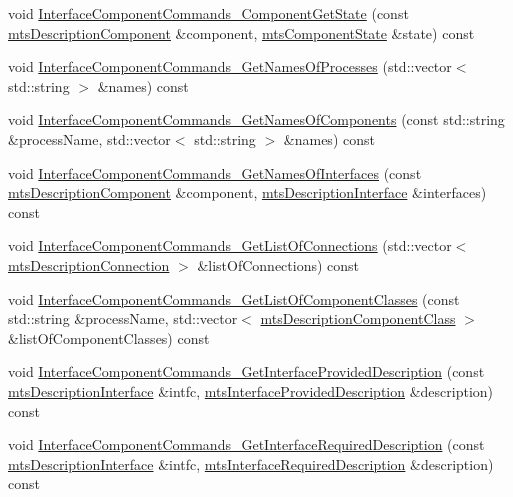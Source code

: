 \begin{DoxyCompactItemize}
\item 
void \hyperlink{classmts_manager_component_client_a71563477c115e8e5e09fd70e989a60db}{Interface\-Component\-Commands\-\_\-\-Component\-Get\-State} (const \hyperlink{classmts_description_component}{mts\-Description\-Component} \&component, \hyperlink{classmts_component_state}{mts\-Component\-State} \&state) const 
\item 
void \hyperlink{classmts_manager_component_client_a9f58399384c52a9fa6c05a3533467a4c}{Interface\-Component\-Commands\-\_\-\-Get\-Names\-Of\-Processes} (std\-::vector$<$ std\-::string $>$ \&names) const 
\item 
void \hyperlink{classmts_manager_component_client_adb5405af61fdc8d9689cf63bb6090a34}{Interface\-Component\-Commands\-\_\-\-Get\-Names\-Of\-Components} (const std\-::string \&process\-Name, std\-::vector$<$ std\-::string $>$ \&names) const 
\item 
void \hyperlink{classmts_manager_component_client_a9f3d21786d18f9c41edb3432bc9326cb}{Interface\-Component\-Commands\-\_\-\-Get\-Names\-Of\-Interfaces} (const \hyperlink{classmts_description_component}{mts\-Description\-Component} \&component, \hyperlink{classmts_description_interface}{mts\-Description\-Interface} \&interfaces) const 
\item 
void \hyperlink{classmts_manager_component_client_a551017574e04ac9cc7eb2f0430ba573e}{Interface\-Component\-Commands\-\_\-\-Get\-List\-Of\-Connections} (std\-::vector$<$ \hyperlink{classmts_description_connection}{mts\-Description\-Connection} $>$ \&list\-Of\-Connections) const 
\item 
void \hyperlink{classmts_manager_component_client_a84f16e0e7370e527e27b3e5ffc70d939}{Interface\-Component\-Commands\-\_\-\-Get\-List\-Of\-Component\-Classes} (const std\-::string \&process\-Name, std\-::vector$<$ \hyperlink{classmts_description_component_class}{mts\-Description\-Component\-Class} $>$ \&list\-Of\-Component\-Classes) const 
\item 
void \hyperlink{classmts_manager_component_client_a824e945df9294a5f0d2232bac4e94d22}{Interface\-Component\-Commands\-\_\-\-Get\-Interface\-Provided\-Description} (const \hyperlink{classmts_description_interface}{mts\-Description\-Interface} \&intfc, \hyperlink{classmts_interface_provided_description}{mts\-Interface\-Provided\-Description} \&description) const 
\item 
void \hyperlink{classmts_manager_component_client_ad50e56091dc851539a7e8fc476c0a4f2}{Interface\-Component\-Commands\-\_\-\-Get\-Interface\-Required\-Description} (const \hyperlink{classmts_description_interface}{mts\-Description\-Interface} \&intfc, \hyperlink{classmts_interface_required_description}{mts\-Interface\-Required\-Description} \&description) const 

\end{DoxyCompactItemize}
